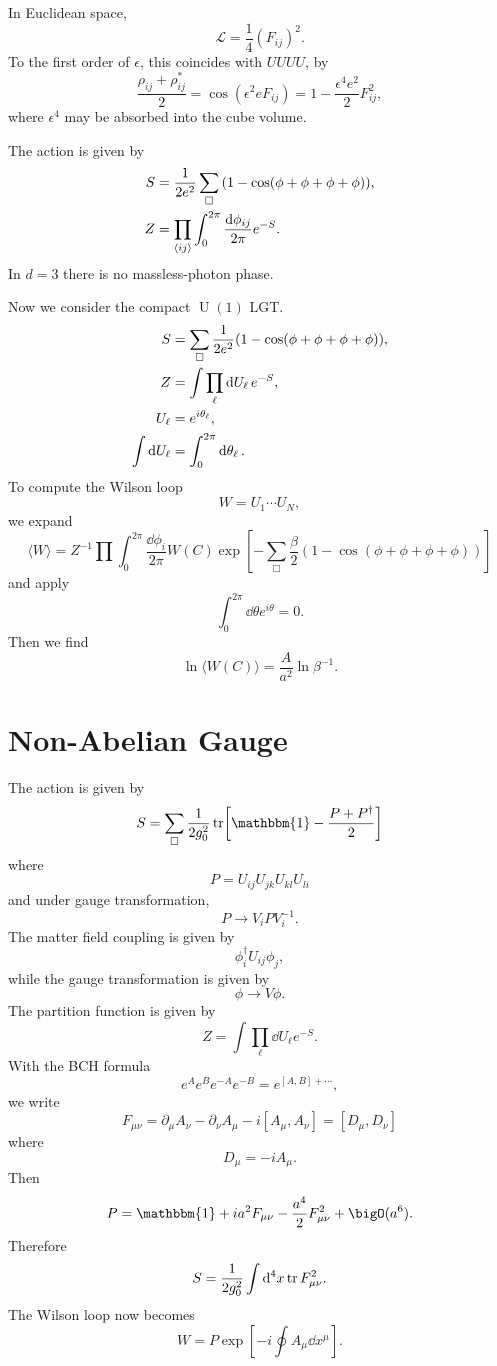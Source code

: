 \documentclass{article}
\begin{document}
\par
In Euclidean space,
\[ \mathcal{L} = \frac{1}{4}(F_{ij})^2. \]
To the first order of $\epsilon$, this coincides with $UUUU$, by
\[ \frac{\rho_{ij} + \rho^*_{ij}}{2} = \cos(\epsilon^2 e F_{ij}) = 1-\frac{\epsilon^4 e^2}{2}F_{ij}^2, \]
where $\epsilon^4$ may be absorbed into the cube volume.
\par
The action is given by
\begin{align*}
    S &= \frac{1}{2e^2} \sum_{\Box} \qty(1-\cos(\phi+\phi+\phi+\phi)), \\
    Z &= \prod_{\langle ij\rangle} \int_0^{2\pi} \frac{\dd{\phi_{ij}}}{2\pi} e^{-S}.
\end{align*}
In $d=3$ there is no massless-photon phase.
\par
Now we consider the compact $\operatorname{U}(1)$ LGT.
\begin{align*}
    S &= \sum_{\Box} \frac{1}{2e^2}\qty(1-\cos(\phi+\phi+\phi+\phi)), \\
    Z &= \int \prod_\ell \dd{U_\ell} e^{-S}, \\
    U_\ell &= e^{i\theta_\ell}, \\
    \int \dd{U_\ell} &= \int_0^{2\pi} \dd{\theta_\ell}.
\end{align*}
To compute the Wilson loop
\[ W = U_1 \cdots U_N, \]
we expand
\[ \langle W \rangle = Z^{-1}\prod \int_{0}^{2\pi} \frac{\dd{\phi_i}}{2\pi} W(C) \exp[-\sum_\Box \frac{\beta}{2}(1-\cos(\phi+\phi+\phi+\phi))] \]
and apply
\[ \int_0^{2\pi} \dd{\theta} e^{i\theta} = 0. \]
Then we find
\[ \ln\langle W(C) \rangle = \frac{A}{a^2} \ln \beta^{-1}. \]

\section{Non-Abelian Gauge}

The action is given by
\[ S = \sum_{\Box} \frac{1}{2g_0^2} \tr[\mathbbm{1} - \frac{P+P^\dagger}{2}] \]
where
\[ P = U_{ij}U_{jk}U_{kl}U_{li} \]
and under gauge transformation,
\[ P \rightarrow V_i P V_i^{-1}. \]
The matter field coupling is given by
\[ \phi^\dagger_i U_{ij} \phi_j, \]
while the gauge transformation is given by
\[ \phi \rightarrow V\phi. \]
The partition function is given by
\[ Z = \int \prod_\ell \dd{U_\ell} e^{-S}. \]
With the BCH formula
\[ e^A e^B e^{-A} e^{-B} = e^{[A,B] + \cdots}, \]
we write
\[ F_{\mu\nu} = \partial_\mu A_\nu - \partial_\nu A_\mu - i[A_\mu,A_\nu] = [D_\mu,D_\nu] \]
where
\[ D_\mu = -iA_\mu. \]
Then
\[ P = \mathbbm{1} + ia^2 F_{\mu\nu} - \frac{a^4}{2} F_{\mu\nu}^2 + \bigO(a^6). \]
Therefore
\[ S = \frac{1}{2g_0^2} \int \dd[4]{x} \tr F_{\mu\nu}^2. \]
The Wilson loop now becomes
\[ W = P \exp[-i\oint A_\mu \dd{x^\mu}]. \]
\end{document}
